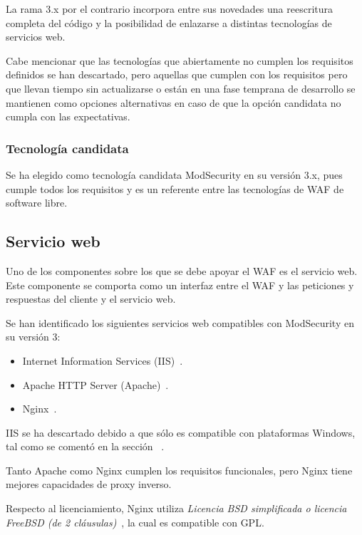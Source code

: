 \par La rama 3.x por el contrario incorpora entre sus novedades una reescritura completa del código y la posibilidad de enlazarse a distintas
tecnologías de servicios web.

\par Cabe mencionar que las tecnologías que abiertamente no cumplen los requisitos definidos se han descartado, pero aquellas que cumplen con los
requisitos pero que llevan tiempo sin actualizarse o están en una fase temprana de desarrollo se mantienen como opciones alternativas en caso de que la
opción candidata no cumpla con las expectativas.
\subsubsection{Tecnología candidata}
\par Se ha elegido como tecnología candidata ModSecurity en su versión 3.x, pues cumple todos los requisitos y es un referente entre las tecnologías de
WAF de software libre.

\subsection{Servicio web}
\par Uno de los componentes sobre los que se debe apoyar el WAF es el servicio web. Este componente se comporta como un interfaz entre el WAF y las peticiones y respuestas del cliente y el servicio web.
\par Se han identificado los siguientes servicios web compatibles con  ModSecurity en su versión 3:
\begin{itemize}
  \item Internet Information Services (IIS)~\cite{iis}.
  \item Apache HTTP Server (Apache)~\cite{apache}.
  \item Nginx~\cite{nginx}.
\end{itemize}
\par IIS se ha descartado debido a que sólo es compatible con plataformas Windows, tal como se comentó en la sección ~.

\par Tanto Apache como Nginx cumplen los requisitos funcionales, pero Nginx tiene mejores capacidades de proxy inverso.

\par Respecto al licenciamiento, Nginx utiliza {\em Licencia BSD simplificada o licencia FreeBSD (de 2 cláusulas)}~\cite{wiki:SimplifiedBSDLicense}, la cual es compatible con GPL.

